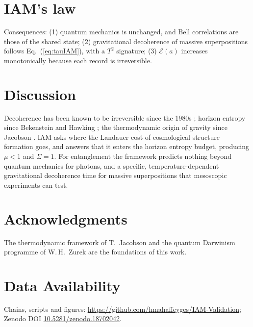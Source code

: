 \documentclass[12pt,a4paper]{article}
\begin{document}
\section{IAM's law}
\label{sec:law}

\noindent{}

\medskip
Consequences: (1) quantum mechanics is unchanged, and Bell correlations are those of
the shared state; (2) gravitational decoherence of massive superpositions follows
Eq.~(\ref{eq:tauIAM}), with a $T^2$ signature; (3) $\mathcal{E}(a)$ increases
monotonically because each record is irreversible.

\section{Discussion}
\label{sec:discussion}

Decoherence has been known to be irreversible since the 1980s
\citep{Zurek1981,JoosZeh1985}; horizon entropy since Bekenstein and Hawking
\citep{Bekenstein1973,Hawking1975}; the thermodynamic origin of gravity since
Jacobson \citep{Jacobson1995}. IAM asks where the Landauer cost of cosmological
structure formation goes, and answers that it enters the horizon entropy budget,
producing $\mu<1$ and $\Sigma=1$. For entanglement the framework predicts nothing
beyond quantum mechanics for photons, and a specific, temperature-dependent
gravitational decoherence time for massive superpositions that mesoscopic
experiments can test.

\section*{Acknowledgments}
The thermodynamic framework of T.\ Jacobson \citep{Jacobson1995} and the quantum
Darwinism programme of W.\,H.\ Zurek \citep{Zurek2003,Zurek2009} are the foundations
of this work.

\section*{Data Availability}
Chains, scripts and figures: \url{https://github.com/hmahaffeyges/IAM-Validation};
Zenodo DOI \href{https://doi.org/10.5281/zenodo.18702042}{10.5281/zenodo.18702042}.
\end{document}
